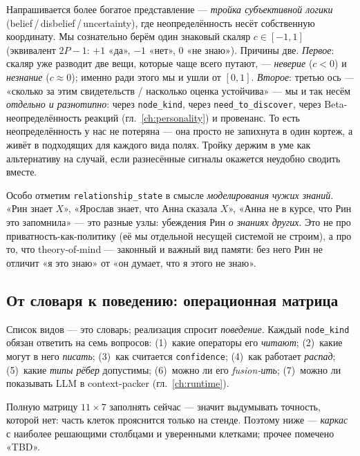 \begin{intuition}
Напрашивается более богатое представление — \emph{тройка субъективной логики}
(belief\,/\,disbelief\,/\,uncertainty), где неопределённость несёт собственную
координату. Мы сознательно берём один знаковый скаляр $c\in[-1,1]$ (эквивалент
$2P{-}1$: $+1$ «да», $-1$ «нет», $0$ «не знаю»). Причины две. \emph{Первое}:
скаляр уже разводит две вещи, которые чаще всего путают, — \emph{неверие} ($c<0$) и
\emph{незнание} ($c\approx0$); именно ради этого мы и ушли от $[0,1]$. \emph{Второе}:
третью ось — «сколько за этим свидетельств / насколько оценка устойчива» — мы и так
несём \emph{отдельно и разнотипно}: через \texttt{node\_kind}, через
\texttt{need\_to\_discover}, через Beta-неопределённость реакций
(гл.~\ref{ch:personality}) и провенанс. То есть неопределённость у нас не потеряна —
она просто не запихнута в один кортеж, а живёт в подходящих для каждого вида полях.
Тройку держим в уме как альтернативу на случай, если разнесённые сигналы окажется
неудобно сводить вместе.
\end{intuition}

\begin{intuition}
Особо отметим \texttt{relationship\_state} в смысле \emph{моделирования чужих
знаний}. «Рин знает $X$», «Ярослав знает, что Анна сказала $X$», «Анна не в курсе,
что Рин это запомнила» — это разные узлы: убеждения Рин \emph{о знаниях других}. Это
не про приватность-как-политику (её мы отдельной несущей системой не строим), а про
то, что theory-of-mind — законный и важный вид памяти: без него Рин не отличит «я это
знаю» от «он думает, что я этого не знаю».
\end{intuition}

\subsection{От словаря к поведению: операционная матрица}
\label{sec:kindmatrix}

Список видов — это словарь; реализация спросит \emph{поведение}. Каждый
\texttt{node\_kind} обязан ответить на семь вопросов: (1)~какие операторы его
\emph{читают}; (2)~какие могут в него \emph{писать}; (3)~как считается
\texttt{confidence}; (4)~как работает \emph{распад}; (5)~какие \emph{типы рёбер}
допустимы; (6)~можно ли его \emph{fusion-ить}; (7)~можно ли показывать LLM в
context-packer (гл.~\ref{ch:runtime}).

Полную матрицу $11\times 7$ заполнять сейчас — значит выдумывать точность, которой
нет: часть клеток прояснится только на стенде. Поэтому ниже — \emph{каркас} с
наиболее решающими столбцами и уверенными клетками; прочее помечено «TBD».

